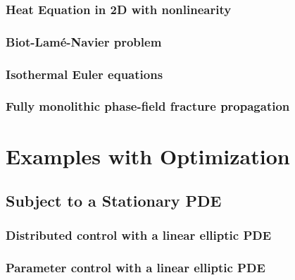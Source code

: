 \documentclass[a4paper,cleardoubleempty]{scrreprt}
\theoremstyle{plain}
\theoremstyle{remark}
\begin{document}
\subsection{Heat Equation in 2D with nonlinearity}
\label{PDE_Instat_Heat_2D}

\clearpage
\subsection{Biot-Lam\'e-Navier problem}
\label{PDE_Instat_biot_lame_navier}

\cleardoublepage
\subsection{Isothermal Euler equations}
\label{PDE_isothermal_euler}

\cleardoublepage
\subsection{Fully monolithic phase-field fracture propagation}
\label{PDE_isothermal_euler}

\cleardoublepage
\chapter{Examples with Optimization}
\label{OPT}
\section{Subject to a Stationary PDE}
\label{OPT_Stat}
\subsection{Distributed control with a linear elliptic PDE}
\label{OPT_Stat_Distrib_Lin_Ellipt}

\clearpage
\subsection{Parameter control with a linear elliptic PDE}
\label{OPT_Stat_Param_Lin_Ellipt}

\clearpage
\end{document}
